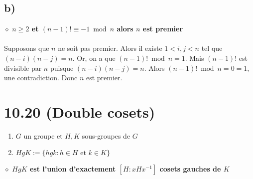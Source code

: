 \documentclass[a4paper,10pt]{article}
\begin{document}
\subsection*{b)}
$\diamond$ \textbf{$n \geq 2$ et $(n-1)! \equiv -1 \bmod n$ alors $n$ est premier}
\\
\\
Supposons que $n$ ne soit pas premier. Alors il existe $1 < i,j < n$ tel que $(n-i)(n-j) = n$. Or, on a que 
$(n-1)! \bmod n = 1$. Mais $(n-1)!$ est divisible par $n$ puisque $(n-i)(n-j) = n$. Alors $(n-1)! \bmod n = 0 = 1$, une contradiction.
Donc $n$ est premier. 

\section*{10.20 (Double cosets)}
\begin{enumerate}
 \item $G$ un groupe et $H,K$ sous-groupes de $G$
 \item $HgK := \{hgk : h \in H \text{ et } k \in K\}$
\end{enumerate}
$\diamond$ \textbf{$HgK$ est l'union d'exactement $[H: xHx^{-1}]$ cosets gauches de $K$}
\end{document}
